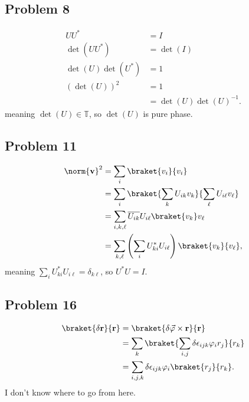 \documentclass[10pt]{mypackage}
\begin{document}
\subsection{Problem 8}%
\begin{align*}
  UU^{\ast} &= I\\
  \det\left(UU^{\ast}\right) &= \det(I)\\
  \det\left(U\right)\det\left(U^{\ast}\right) &= 1\\
  \left(\det\left(U\right)\right)^2 &= 1\\
                                    &= \det\left(U\right)\det\left(U\right)^{-1}.
\end{align*}
meaning $\det(U)\in \mathds{T}$, so $\det(U)$ is pure phase.
\subsection{Problem 11}%
\begin{align*}
\norm{\mathbf{v}}^2 &= \sum_{i}\braket{v_i}{v_i}\\
                    &= \sum_{i}\braket{\sum_{k}U_{ik}v_k}{\sum_{\ell}U_{i\ell}v_{\ell}}\\
                    &= \sum_{i,k,\ell}\overline{U_{ik}}U_{i\ell}\braket{v_{k}}v_{\ell}\\
                    &= \sum_{k,\ell}\left(\sum_{i}U_{ki}^{\ast}U_{i\ell}\right)\braket{v_k}{v_{\ell}},
\end{align*}
meaning $\sum_{i}U_{ki}^{\ast}U_{i\ell} = \delta_{k\ell}$, so $U^{\ast}U = I$.
\subsection{Problem 16}%
\begin{align*}
  \braket{\delta \mathbf{r}}{\mathbf{r}} &= \braket{\delta\vec{\varphi}\times \mathbf{r}}{\mathbf{r}}\\
                                         &= \sum_{k}\braket{\sum_{i,j}\delta\epsilon_{ijk}\varphi_{i}r_j}{r_{k}}\\
                                         &= \sum_{i,j,k}\delta\epsilon_{ijk}\varphi_i\braket{r_j}{r_k}.
\end{align*}
I don't know where to go from here.
\end{document}
